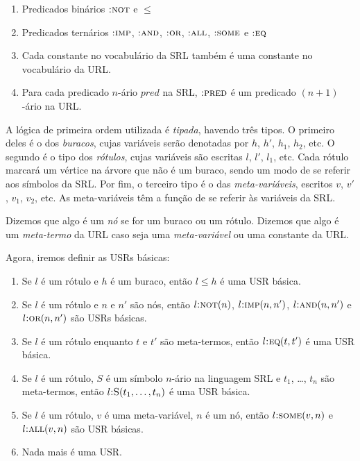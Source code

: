 \begin{enumerate}
\item Predicados binários $\textsc{:not}$ e $\leq$
\item Predicados ternários $\textsc{:imp}$, $\textsc{:and}$, $\textsc{:or}$, $\textsc{:all}$, $\textsc{:some}$ e $\textsc{:eq}$
\item Cada constante no vocabulário da SRL também é uma constante no vocabulário da URL.
\item Para cada predicado $n$-ário $pred$ na SRL, $\textsc{:pred}$ é um predicado $(n+1)$-ário na URL.
\end{enumerate}

A lógica de primeira ordem utilizada é \textit{tipada}, havendo três tipos. O primeiro deles é o dos \textit{buracos}, cujas variáveis serão denotadas por $h$, $h'$, $h_1$, $h_2$, etc. O segundo é o tipo dos \textit{rótulos}, cujas variáveis são escritas $l$, $l'$, $l_1$, etc. Cada rótulo marcará um vértice na árvore que não é um buraco, sendo um modo de se referir aos símbolos da SRL. Por fim, o terceiro tipo é o das \textit{meta-variáveis}, escritos $v$, $v'$, $v_1$, $v_2$, etc. As meta-variáveis têm a função de se referir às variáveis da SRL.

Dizemos que algo é um \textit{nó} se for um buraco ou um rótulo. Dizemos que algo é um \textit{meta-termo} da URL caso seja uma \textit{meta-variável} ou uma constante da URL.

Agora, iremos definir as USRs básicas:

\begin{enumerate}
\item Se $l$ é um rótulo e $h$ é um buraco, então $l \leq h$ é uma USR básica. \label{om-const}
\item Se $l$ é um rótulo e $n$ e $n'$ são nós, então $l\textsc{:not}(n)$, $l\textsc{:imp}(n,n')$, $l\textsc{:and}(n,n')$ e $l\textsc{:or}(n,n')$ são USRs básicas.
\item Se $l$ é um rótulo enquanto $t$ e $t'$ são meta-termos, então $l\textsc{:eq}(t,t')$ é uma USR básica.
\item Se $l$ é um rótulo, $S$ é um símbolo $n$-ário na linguagem SRL e $t_1$, \dots, $t_n$ são meta-termos, então $l\textsc{:S}(t_1,\dots, t_n)$ é uma USR básica.
\item Se $l$ é um rótulo, $v$ é uma meta-variável, $n$ é um nó,	então $l\textsc{:some}(v,n)$ e $l\textsc{:all}(v,n)$ são USR básicas.
\item Nada mais é uma USR.
\end{enumerate}

